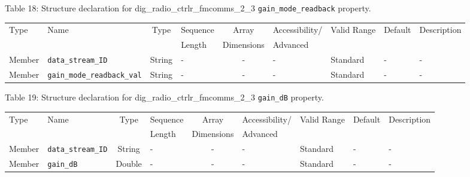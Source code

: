\documentclass{article}
\def\comp{dig\_radio\_ctrlr\_fmcomms\_2\_3}
\begin{document}
\begin{landscape}
	\noindent Table \hypertarget{tab18}{18}: Structure declaration for \comp{} \verb+gain_mode_readback+ property.
	\begin{scriptsize}
		\noindent\begin{longtable}{|p{1.8cm}|p{3.6cm}|c|p{4cm}|c|p{2cm}|p{1.7cm}|p{0.8cm}|p{4.81cm}|}
			\hline
			\rowcolor{blue}
			Type         & Name                                & Type & Sequence & Array      & Accessibility/ & Valid Range  & Default & Description                                                                                                                                                                                                                       \\
			\rowcolor{blue}
			             &                                     &      & Length   & Dimensions & Advanced       &              &         &                                                                                                                                                                                                                             \\
			\hline
			Member       & \verb+data_stream_ID+               & String& -       & -          & -              & Standard     & -       & - \\
			\hline
			Member       & \verb+gain_mode_readback_val+        & String & -       & -          & -              & Standard & -       & - \\
			\hline
		\end{longtable}
	\end{scriptsize}

	\noindent Table \hypertarget{tab19}{19}: Structure declaration for \comp{} \verb+gain_dB+ property.
	\begin{scriptsize}
		\noindent\begin{longtable}{|p{1.8cm}|p{3.6cm}|c|p{4cm}|c|p{2cm}|p{1.7cm}|p{0.8cm}|p{4.69cm}|}
			\hline
			\rowcolor{blue}
			Type         & Name                                & Type & Sequence & Array      & Accessibility/ & Valid Range  & Default & Description                                                                                                                                                                                                                       \\
			\rowcolor{blue}
			             &                                     &      & Length   & Dimensions & Advanced       &              &         &                                                                                                                                                                                                                             \\
			\hline
			Member       & \verb+data_stream_ID+               & String& -       & -          & -              & Standard     & -       & - \\
			\hline
			Member       & \verb+gain_dB+                       & Double & -       & -          & -              & Standard & -       & - \\
			\hline
		\end{longtable}
	\end{scriptsize}


\end{landscape}
\end{document}
